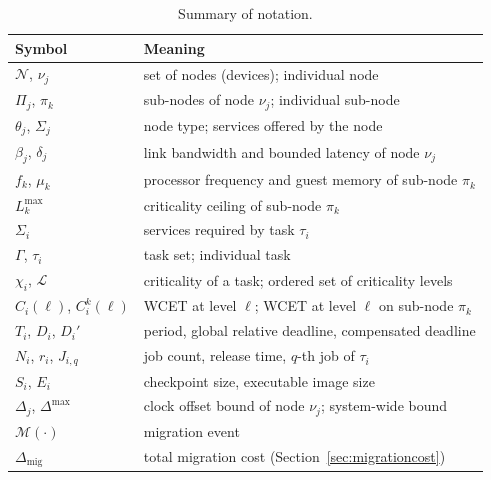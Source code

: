 \begin{table}[t]
	\centering
	\caption{Summary of notation.}
	\label{tab:notation}
	\begin{tabular}{@{}ll@{}}
		\toprule
		Symbol & Meaning \\
		\midrule
		$\mathcal{N}$, $\nu_j$    & set of nodes (devices); individual node \\
		$\Pi_j$, $\pi_k$          & sub-nodes of node $\nu_j$; individual sub-node \\
		$\theta_j$, $\Sigma_j$    & node type; services offered by the node \\
		$\beta_j$, $\delta_j$     & link bandwidth and bounded latency of node $\nu_j$ \\
		$f_k$, $\mu_k$            & processor frequency and guest memory of sub-node $\pi_k$ \\
		$L_k^{\max}$              & criticality ceiling of sub-node $\pi_k$ \\
		$\Sigma_i$                & services required by task $\tau_i$ \\
		$\Gamma$, $\tau_i$        & task set; individual task \\
		$\chi_i$, $\mathcal{L}$   & criticality of a task; ordered set of criticality levels \\
		$C_i(\ell)$, $C_i^k(\ell)$ & WCET at level $\ell$; WCET at level $\ell$ on sub-node $\pi_k$ \\
		$T_i$, $D_i$, $D_i'$      & period, global relative deadline, compensated deadline \\
		$N_i$, $r_i$, $J_{i,q}$   & job count, release time, $q$-th job of $\tau_i$ \\
		$S_i$, $E_i$              & checkpoint size, executable image size \\
		$\Delta_j$, $\Delta^{\max}$ & clock offset bound of node $\nu_j$; system-wide bound \\
		$\mathcal{M}(\cdot)$      & migration event \\
		$\Delta_{\mathrm{mig}}$   & total migration cost (Section~\ref{sec:migrationcost}) \\
		\bottomrule
	\end{tabular}
\end{table}


